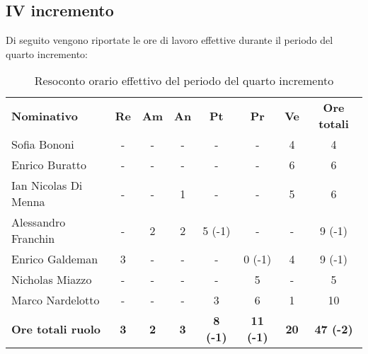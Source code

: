 \documentclass[../piano-di-progetto.tex]{subfiles}
\begin{document}
\subsection{IV incremento}

Di seguito vengono riportate le ore di lavoro effettive durante il periodo del quarto incremento:
\begin{table}[H]
    \centering
    \begin{tabular}{lccccccc}
      \rowcolor{lightgray}
      \textbf{Nominativo}       & \textbf{Re}      & \textbf{Am} & \textbf{An}      & \textbf{Pt} & \textbf{Pr} & \textbf{Ve} & \textbf{Ore totali} \\
Sofia Bononi              & -          & -          & -          & -               & -                & 4           & 4                \\
Enrico Buratto            & -          & -          & -          & -               & -                & 6           & 6                \\
Ian Nicolas Di Menna      & -          & -          & 1          & -               & -                & 5           & 6                \\
Alessandro Franchin       & -          & 2          & 2          & 5 (-1)          & -                & -           & 9 (-1)           \\
Enrico Galdeman           & 3          & -          & -          & -               & 0 (-1)           & 4           & 9 (-1)           \\
Nicholas Miazzo           & -          & -          & -          & -               & 5                & -           & 5                \\
Marco Nardelotto          & -          & -          & -          & 3               & 6                & 1           & 10               \\
\textbf{Ore totali ruolo} & \textbf{3} & \textbf{2} & \textbf{3} & \textbf{8 (-1)} & \textbf{11 (-1)} & \textbf{20} & \textbf{47 (-2)}

    \end{tabular}
    \caption{Resoconto orario effettivo del periodo del quarto incremento}
  \end{table}
\end{document}

